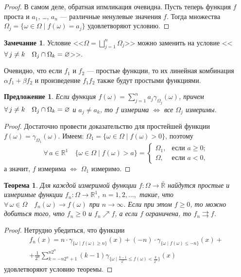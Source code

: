 \documentclass[12pt,titlepage]{article}
\newcounter{tema}
\newtheorem{theorem}{Теорема}[tema]
\newtheorem{predl}{Предложение}[tema]
\theoremstyle{definition}
\newtheorem*{zam}{Замечание}
\newcommand*{\p}[1]{#1\nobreak\discretionary{}{\hbox{$\mathsurround=0pt #1$}}{}}
\begin{document}
\begin{proof}
В самом деле, обратная ипмликация очевидна. Пусть теперь функция $f$
проста и $a_1$, \ldots, $a_n$ --- различные ненулевые значения $f$.
Тогда множества $\Omega_j=\{\omega\in\Omega\mid f(\omega)=a_j\}$
удовлетворяют условию.
\end{proof}

\begin{zam}
Условие <<$\Omega=\bigsqcup\limits_{j=1}^n \Omega_j$>> можно
заменить на условие <<$\forall\, j\p\neq k\quad
\Omega_j\cap\Omega_k=\varnothing$>>.
\end{zam}

Очевидно, что если $f_1$ и $f_2$ --- простые функции, то их линейная
комбинация $\alpha f_1+\beta f_2$ и произведение $f_1f_2$ также
будут простыми функциями.

\begin{predl}
Если функция $f(\omega)=\sum\limits_{j=1}^n
a_j\gamma_{\Omega_j}(\omega)$, причем $\forall\, j\p\neq k\quad
\Omega_j\cap \Omega_k=\varnothing$ и $a_j\neq a_k$, то $f$ измерима
$\Leftrightarrow$ все $\Omega_j$ измеримы.
\end{predl}

\begin{proof}
Достаточно провести доказательство для простейшей функции
$f(\omega)=\gamma_{\Omega_1}(\omega)$. Имеем:
$\Omega_1=\{\omega\in\Omega \mid f(\omega)>0\}$, поэтому
$$\forall\, a\in\mathbb{R}^1\quad \{\omega\in\Omega\mid f(\omega)>a\}
=\begin{cases}\Omega_1,&\text{если $a\geqslant 0$};\\
\Omega,& \text{если $a<0$},\end{cases}$$ а значит, $f$ измерима
$\Leftrightarrow$ $\Omega_1$ измеримо.
\end{proof}

\begin{theorem}
\label{fun.approx}Для каждой измеримой функции $f\colon \Omega\to
\bar{\mathbb{R}}$ найдутся простые и измеримые функции $f_n\colon
\Omega\to\mathbb{R}^1$, $n=1,2,\ldots,$ такие, что $\forall\,
\omega\in\Omega\quad f_n(\omega)\to f(\omega)$ при $n\to\infty$.
Если при этом $f\geqslant 0$, то можно добиться того, что
$f_n\geqslant0$ и $f_n\nearrow f$, а если $f$ ограничена, то
$f_n\rightrightarrows f$.
\end{theorem}

\begin{proof}
Нетрудно убедиться, что функции
\begin{multline*}
f_n(x)=n\cdot\gamma_{\{\omega\mid f(\omega)\geqslant n\}}(x)+(-n)
\cdot \gamma_{\{\omega\mid f(\omega)\leqslant
-n\}}(x)+\\
+\frac{1}{2^n}
\sum\limits_{k=-n2^n+1}^{n2^n}(k-1)\gamma_{\{\omega\mid
\frac{k-1}{2^n}\leqslant f(\omega)<\frac{k}{2^n}\}}(x)
\end{multline*}
удовлетворяют условию теоремы.
\end{proof}
\end{document}
